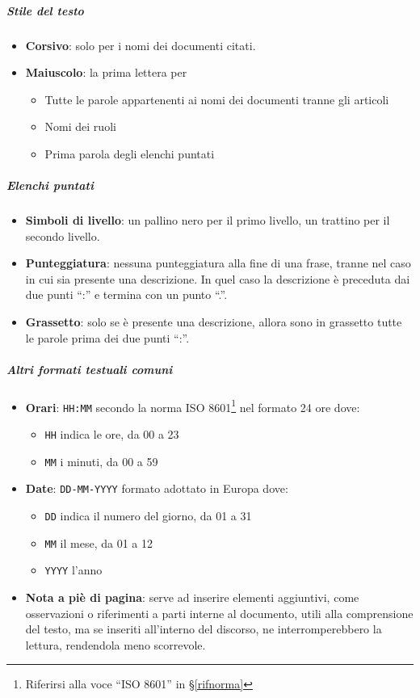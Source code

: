 			\subparagraph{Stile del testo}\label{PS:Documentazione:Design:NormeT:StileTesto}
			\begin{itemize}
				\item \textbf{Corsivo}: solo per i nomi dei documenti citati.
				\item \textbf{Maiuscolo}: la prima lettera per
				\begin{itemize}
					\item Tutte le parole appartenenti ai nomi dei documenti tranne gli articoli
					\item Nomi dei ruoli
					\item Prima parola degli elenchi puntati
				\end{itemize}
			\end{itemize}

			\subparagraph{Elenchi puntati}\label{PS:Documentazione:Design:NormeT:ElenchiPuntati}
			\begin{itemize}
				\item \textbf{Simboli di livello}: un pallino nero per il primo livello, un trattino per il secondo livello.
				\item \textbf{Punteggiatura}: nessuna punteggiatura alla fine di una frase, tranne nel caso in cui sia presente una descrizione.
					In quel caso la descrizione è preceduta dai due punti ``:'' e termina con un punto ``.''.
				\item \textbf{Grassetto}: solo se è presente una descrizione, allora sono in grassetto tutte le parole prima dei due punti ``:''.
			\end{itemize}

			\subparagraph{Altri formati testuali comuni} \label{PS:Documentazione:Design:NormeT:AltriFormati}
			\begin{itemize}
				\item \textbf{Orari}: \texttt{HH:MM} secondo la norma ISO 8601\footnote{Riferirsi alla voce ``ISO 8601'' in \S\ref{rifnorma}}
				nel formato 24 ore dove:
				\begin{itemize}
					\item \texttt{HH} indica le ore, da 00 a 23
					\item \texttt{MM} i minuti, da 00 a 59
				\end{itemize}
				\item \textbf{Date}: \texttt{DD-MM-YYYY} formato adottato in Europa dove:
				\begin{itemize}
					\item \texttt{DD} indica il numero del giorno, da 01 a 31
					\item \texttt{MM} il mese, da 01 a 12
					\item \texttt{YYYY} l'anno
				\end{itemize}
				\item \textbf{Nota a piè di pagina}: serve ad inserire elementi aggiuntivi, come osservazioni o riferimenti a parti interne al documento, utili alla comprensione del testo,
				ma se inseriti all'interno del discorso, ne interromperebbero la lettura, rendendola meno scorrevole.
			\end{itemize}


